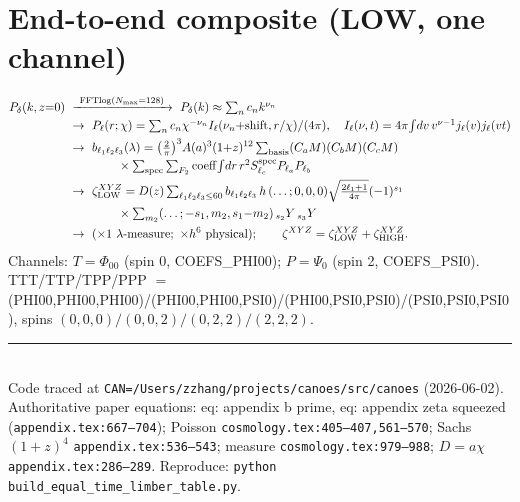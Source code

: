 \documentclass[11pt]{article}
\newcommand{\code}[1]{\texttt{\footnotesize #1}}
\newcommand{\eq}[1]{\textsf{#1}}                 %
\newcommand{\chh}{\chi}
\newcommand{\lam}{\lambda}
\newcommand{\Phizero}{\Phi_{00}}
\newcommand{\Psizero}{\Psi_{0}}
\newcommand{\Dgrow}{D}
\begin{document}
\section{End-to-end composite (LOW, one channel)}
{\footnotesize
\begin{align}
P_\delta(k,z{=}0)\ &\xrightarrow{\ \text{FFTlog}(N_{\max}=128)\ }\ P_\delta(k)\approx\textstyle\sum_n c_n k^{\nu_n}\notag\\
&\to\ P_\ell(r;\chh)=\textstyle\sum_n c_n\chh^{-\nu_n}I_\ell(\nu_n{+}\mathrm{shift},r/\chh)/(4\pi),\quad
   I_\ell(\nu,t)=4\pi\!\int\! dv\,v^{\nu-1}j_\ell(v)j_\ell(vt)\notag\\
&\to\ b_{\ell_1\ell_2\ell_3}(\lam)=\bigl(\tfrac2\pi\bigr)^3 A(a)^3(1{+}z)^{12}
   \textstyle\sum_{\mathrm{basis}}(C_aM)(C_bM)(C_cM)\notag\\
&\qquad\qquad\times\textstyle\sum_{\mathrm{spec}}\sum_{F_2}\mathrm{coeff}\!\int\! dr\,r^2 S^{\mathrm{spec}}_{\ell_c}P_{\ell_a}P_{\ell_b}\notag\\
&\to\ \zeta_{\mathrm{LOW}}^{XYZ}=\Dgrow(z)\textstyle\sum_{\ell_1\ell_2\ell_3\le60}b_{\ell_1\ell_2\ell_3}\,
   h\,(\ldots;0,0,0)\sqrt{\tfrac{2\ell_1+1}{4\pi}}(-1)^{s_1}\notag\\
&\qquad\qquad\times\textstyle\sum_{m_2}(\ldots;-s_1,m_2,s_1{-}m_2)\,{}_{s_2}Y\,{}_{s_3}Y\notag\\
&\to\ (\times1\ \text{$\lam$-measure};\ \times h^6\ \text{physical});\qquad
   \zeta^{XYZ}=\zeta_{\mathrm{LOW}}^{XYZ}+\zeta_{\mathrm{HIGH}}^{XYZ}.\notag
\end{align}}
Channels: $T=\Phizero$ (spin 0, \textsf{COEFS\_PHI00}); $P=\Psizero$ (spin 2,
\textsf{COEFS\_PSI0}).
TTT/TTP/TPP/PPP $=$ (PHI00,PHI00,PHI00)/(PHI00,PHI00,PSI0)/(PHI00,PSI0,PSI0)/(PSI0,PSI0,PSI0),
spins $(0,0,0)/(0,0,2)/(0,2,2)/(2,2,2)$.

\vfill
\noindent\rule{\textwidth}{0.4pt}\\
{\footnotesize Code traced at \code{CAN=/Users/zzhang/projects/canoes/src/canoes} (2026-06-02).
Authoritative paper equations: \eq{eq: appendix b prime}, \eq{eq: appendix zeta squeezed}
(\code{appendix.tex:667--704}); Poisson \code{cosmology.tex:405--407,561--570}; Sachs $(1{+}z)^4$
\code{appendix.tex:536--543}; measure \code{cosmology.tex:979--988}; $D{=}a\chh$
\code{appendix.tex:286--289}. Reproduce: \code{python build\_equal\_time\_limber\_table.py}.}
\end{document}
